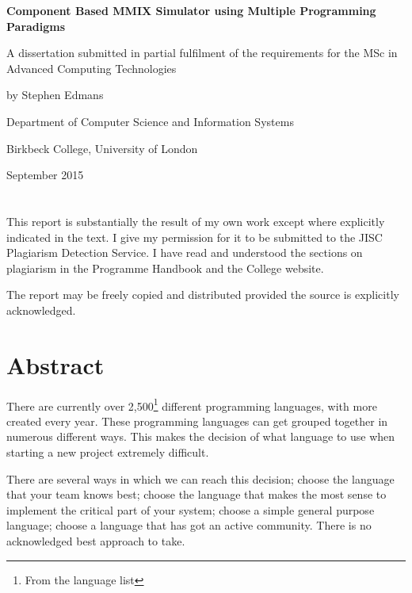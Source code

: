 \documentclass[a4paper,11pt]{report}
\begin{document}
\begin{titlepage}
	\centering
	{\bfseries Component Based MMIX Simulator using Multiple Programming Paradigms \par}
	\vspace{1cm}
	{A dissertation submitted in partial fulfilment of the requirements for the MSc in Advanced Computing Technologies\par}
	\vspace{1.5cm}
	{by Stephen Edmans\par}
	\vspace{2cm}
	{Department of Computer Science and Information Systems\par}
	{Birkbeck College, University of London\par}
	\vspace{2cm}
	{\large September 2015\par}
\end{titlepage}
\newpage
\chapter*{} %
{This report is substantially the result of my own work except where explicitly
indicated in the text. I give my permission for it to be submitted to the JISC
Plagiarism Detection Service. I have read and understood the sections on plagiarism
in the Programme Handbook and the College website.\par}
\vspace{1cm}
{\noindent The report may be freely copied and distributed provided the source is explicitly
acknowledged.}
\chapter*{Abstract}

There are currently over 2,500\footnote{From the language list\cite{numlangs}} different programming languages, with more created every year. These programming languages can get grouped together in numerous different ways.  This makes the decision of what language to use when starting a new project extremely difficult.

There are several ways in which we can reach this decision; choose the language that your team knows best; choose the language that makes the most sense to implement the critical part of your system; choose a simple general purpose language; choose a language that has got an active community. There is no acknowledged best approach to take.
\end{document}
